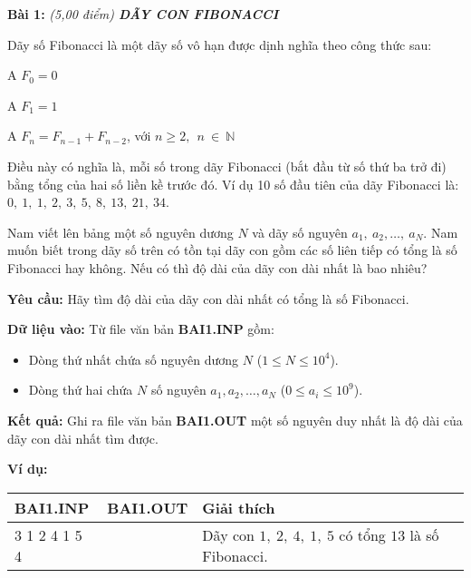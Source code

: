\documentclass[
]{article}
\begin{document}
\textbf{Bài 1:} \it{(5,00 điểm)} \textbf{DÃY CON FIBONACCI}

Dãy số Fibonacci là một dãy số vô hạn được dịnh nghĩa theo công thức
sau:

A $F_{0} = 0$

A $F_{1} = 1$

A $F_{n} = F_{n - 1} + F_{n - 2}$, với
$n \geq 2,\ \ n\ ∈ \ ℕ$

Điều này có nghĩa là, mỗi số trong dãy Fibonacci (bắt đầu từ số thứ ba
trở đi) bằng tổng của hai số liền kề trước đó. Ví dụ 10 số đầu tiên của
dãy Fibonacci là: $0,\ 1,\ 1,\ 2,\ 3,\ 5,\ 8,\ 13,\ 21,\ 34$.

Nam viết lên bảng một số nguyên dương $N$ và dãy số nguyên
$a_{1},\ a_{2},\ldots,\ a_{N}$. Nam muốn biết trong dãy số trên có tồn
tại dãy con gồm các số liên tiếp có tổng là số Fibonacci hay không. Nếu
có thì độ dài của dãy con dài nhất là bao nhiêu?

\textbf{Yêu cầu:} Hãy tìm độ dài của dãy con dài nhất có tổng là số
Fibonacci.

\textbf{Dữ liệu vào:} Từ file văn bản \textbf{BAI1.INP} gồm:

\begin{itemize}
\item
  Dòng thứ nhất chứa số nguyên dương $N$ ($1 \leq N \leq 10^{4}$).
\item
  Dòng thứ hai chứa $N$ số nguyên $a_{1},a_{2},\ldots,a_{N}$
  ($0 \leq a_{i} \leq 10^{9}$).
\end{itemize}

\textbf{Kết quả:} Ghi ra file văn bản \textbf{BAI1.OUT} một số nguyên
duy nhất là độ dài của dãy con dài nhất tìm được.

\textbf{Ví dụ:}

\begin{longtable}[]{@{}
  >{\raggedright\arraybackslash}p{}
  >{\raggedright\arraybackslash}p{}
  >{\raggedright\arraybackslash}p{}
  >{\raggedright\arraybackslash}p{}@{}}
\toprule\noalign{}
\begin{minipage}[b]{\linewidth}\centering
\textbf{BAI1.INP}
\end{minipage} & \begin{minipage}[b]{\linewidth}\centering
\textbf{BAI1.OUT}
\end{minipage} & \begin{minipage}[b]{\linewidth}\centering
\textbf{Giải thích}
\end{minipage} & \begin{minipage}[b]{\linewidth}\centering
\end{minipage} \\
\midrule\noalign{}
\endhead
\bottomrule\noalign{}
\endlastfoot
7

3 1 2 4 1 5 4 & 5 & Dãy con $1,\ 2,\ 4,\ 1,\ 5$ có tổng $13$ là số
Fibonacci. & \\
\end{longtable}
\end{document}

